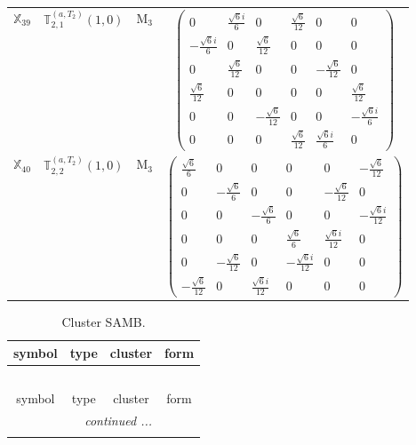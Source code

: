 \documentclass[fleqn,10pt,landscape]{article}
\begin{document}
\begin{itemize}
\begin{center}
\begin{longtable}{c|c|c|c}
$ \mathbb{X}_{39} $ & $\mathbb{T}_{2,1}^{(a,T_{2})}(1,0)$ & M$_{3}$ & $\begin{pmatrix} 0 & \frac{\sqrt{6} i}{6} & 0 & \frac{\sqrt{6}}{12} & 0 & 0 \\ - \frac{\sqrt{6} i}{6} & 0 & \frac{\sqrt{6}}{12} & 0 & 0 & 0 \\ 0 & \frac{\sqrt{6}}{12} & 0 & 0 & - \frac{\sqrt{6}}{12} & 0 \\ \frac{\sqrt{6}}{12} & 0 & 0 & 0 & 0 & \frac{\sqrt{6}}{12} \\ 0 & 0 & - \frac{\sqrt{6}}{12} & 0 & 0 & - \frac{\sqrt{6} i}{6} \\ 0 & 0 & 0 & \frac{\sqrt{6}}{12} & \frac{\sqrt{6} i}{6} & 0 \end{pmatrix}$ \\
$ \mathbb{X}_{40} $ & $\mathbb{T}_{2,2}^{(a,T_{2})}(1,0)$ & M$_{3}$ & $\begin{pmatrix} \frac{\sqrt{6}}{6} & 0 & 0 & 0 & 0 & - \frac{\sqrt{6}}{12} \\ 0 & - \frac{\sqrt{6}}{6} & 0 & 0 & - \frac{\sqrt{6}}{12} & 0 \\ 0 & 0 & - \frac{\sqrt{6}}{6} & 0 & 0 & - \frac{\sqrt{6} i}{12} \\ 0 & 0 & 0 & \frac{\sqrt{6}}{6} & \frac{\sqrt{6} i}{12} & 0 \\ 0 & - \frac{\sqrt{6}}{12} & 0 & - \frac{\sqrt{6} i}{12} & 0 & 0 \\ - \frac{\sqrt{6}}{12} & 0 & \frac{\sqrt{6} i}{12} & 0 & 0 & 0 \end{pmatrix}$ \\
\end{longtable}
\end{center}
\begin{center}
\renewcommand{\arraystretch}{1.3}
\begin{longtable}{c|c|c|c}
\caption{Cluster SAMB.}
 \\
 \hline \hline
symbol & type & cluster & form \\ \hline \endfirsthead

\multicolumn{3}{l}{\tablename\ \thetable{}} \\
 \hline \hline
symbol & type & cluster & form \\ \hline \endhead

 \hline \hline
\multicolumn{3}{r}{\footnotesize\it continued ...} \\ \endfoot


\end{longtable}
\end{center}
\end{itemize}
\end{document}
